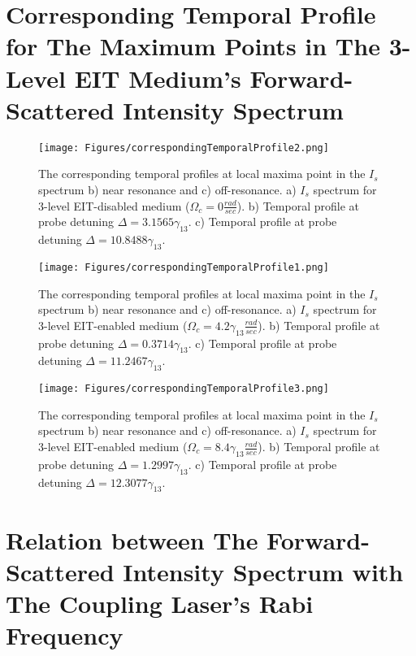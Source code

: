 \section{Corresponding Temporal Profile for The Maximum Points in The 3-Level EIT Medium's Forward-Scattered Intensity Spectrum}

\begin{figure}[h!]
    \centering
    \texttt{[image: Figures/correspondingTemporalProfile2.png]}
    \caption{The corresponding temporal profiles at local maxima point in the $I_{s}$ spectrum b) near resonance and c) off-resonance. a) $I_{s}$ spectrum for 3-level EIT-disabled medium ($\Omega_{c} = 0 \frac{rad}{sec}$). b)  Temporal profile at probe detuning $\Delta = 3.1565\gamma_{13}$. c) Temporal profile at probe detuning $\Delta = 10.8488\gamma_{13}$.}
    \label{fig: corresponding temporal profile 1}
\end{figure}

\begin{figure}[h!]
    \centering
     \texttt{[image: Figures/correspondingTemporalProfile1.png]}
    \caption{The corresponding temporal profiles at local maxima point in the $I_{s}$ spectrum b) near resonance and c) off-resonance. a) $I_{s}$ spectrum for 3-level EIT-enabled medium ($\Omega_{c} = 4.2\gamma_{13} \frac{rad}{sec}$). b)  Temporal profile at probe detuning $\Delta = 0.3714\gamma_{13}$. c) Temporal profile at probe detuning $\Delta = 11.2467\gamma_{13}$.}
    \label{fig: corresponding temporal profile 2}
\end{figure}

\begin{figure}[h!]
    \centering
    \texttt{[image: Figures/correspondingTemporalProfile3.png]}
    \caption{The corresponding temporal profiles at local maxima point in the $I_{s}$ spectrum b) near resonance and c) off-resonance. a) $I_{s}$ spectrum for 3-level EIT-enabled medium ($\Omega_{c} = 8.4\gamma_{13} \frac{rad}{sec}$). b)  Temporal profile at probe detuning $\Delta = 1.2997\gamma_{13}$. c) Temporal profile at probe detuning $\Delta = 12.3077\gamma_{13}$.}
    \label{fig: corresponding temporal profile 3}
\end{figure}


\section{Relation between The Forward-Scattered Intensity Spectrum with The Coupling Laser's Rabi Frequency}


